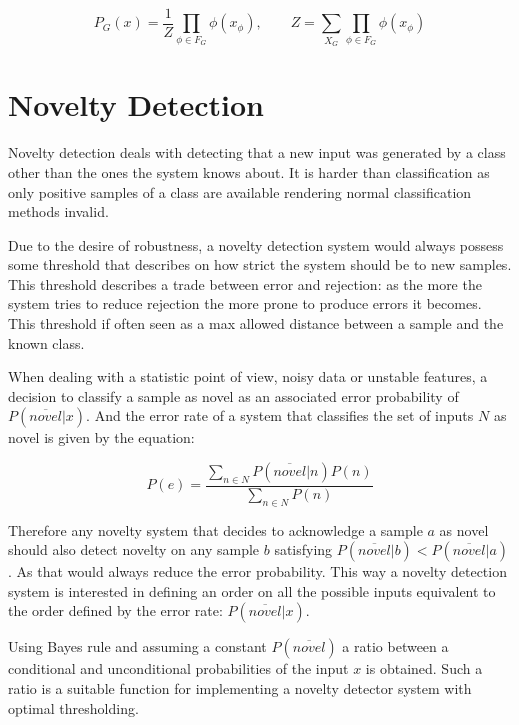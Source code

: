 \documentclass[runningheads,a4paper]{llncs}
\begin{document}
\begin{equation}
P_G(x) = \frac{1}{Z}\prod_{\phi \in F_G}{\phi(x_{\phi})},\qquad
Z = \sum_{X_G}\prod_{\phi \in F_G}{\phi(x_{\phi})}
\end{equation}


\section{Novelty Detection}
Novelty detection deals with detecting that a new input was generated by a class
other than the ones the system knows about\cite{markou2003novelty}.
It is harder than classification as only positive samples of a class are available
rendering normal classification methods invalid.

Due to the desire of robustness, a novelty detection system would
always possess some threshold that describes on how strict the system should be to
new samples. This threshold describes a trade between error and rejection: as the
more the system tries to reduce rejection the more prone to produce
errors it becomes.
This threshold if often seen as a max allowed distance between a sample and the known
class.

When dealing with a statistic point of view, noisy data or unstable features, a decision to
classify a sample as novel as an associated error probability of $P(\overline{novel}|x)$.
And the error rate of a system that classifies the set of inputs $N$ as novel is given by
the equation:

\begin{equation}
P(e) = \frac{\sum_{n \in N}{P(\overline{novel}|n)P(n)}}{\sum_{n \in N}{P(n)}}
\end{equation}

Therefore any novelty system that decides to acknowledge a sample
$a$ as novel should also detect novelty on any sample $b$ satisfying
$P(\overline{novel}|b) < P(\overline{novel}|a)$.
As that would always reduce the error probability.
This way a novelty detection system is interested in defining an
order on all the possible inputs equivalent to the order defined by
the error rate: $P(\overline{novel}|x)$.

Using Bayes rule and assuming a constant $P(\overline{novel})$
a ratio between a conditional and unconditional probabilities of the input $x$ is obtained.
Such a ratio is a suitable function for implementing a novelty detector system with optimal
thresholding.
\end{document}
